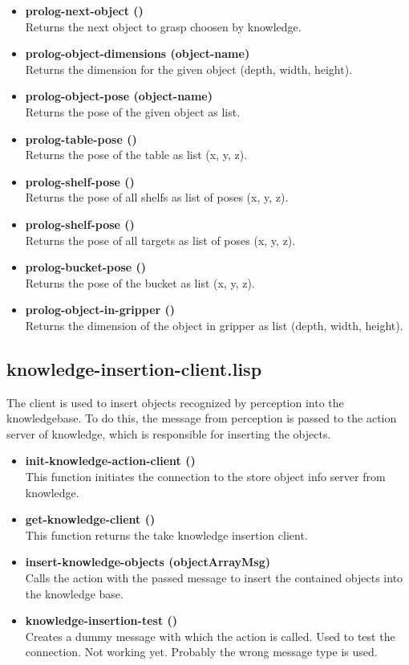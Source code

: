 \documentclass[main.tex]{subfiles}
\begin{document}
\begin{itemize}
				\item \textbf{prolog-next-object ()} \\ Returns the next object to grasp choosen by knowledge.
		    \item \textbf{prolog-object-dimensions (object-name)} \\ Returns the dimension for the given object (depth, width, height).
				\item \textbf{prolog-object-pose (object-name)} \\ Returns the pose of the given object as list.
				\item \textbf{prolog-table-pose ()} \\ Returns the pose of the table as list (x, y, z).
				\item \textbf{prolog-shelf-pose ()} \\ Returns the pose of all shelfs as list of poses (x, y, z).
				\item \textbf{prolog-shelf-pose ()} \\ Returns the pose of all targets as list of poses (x, y, z).
				\item \textbf{prolog-bucket-pose ()} \\ Returns the pose of the bucket as list (x, y, z).
				\item \textbf{prolog-object-in-gripper ()} \\ Returns the dimension of the object in gripper as list (depth, width, height).
			\end{itemize} 
		\subsection{knowledge-insertion-client.lisp}
		\label{knowledge-insertion}
		The client is used to insert objects recognized by perception into the knowledgebase. To do this, the message from perception is passed to the action server of knowledge, which is responsible for inserting the objects.
		\begin{itemize}
		  \item \textbf{init-knowledge-action-client ()} \\
		  This function initiates the connection to the store object info server from knowledge.
		  \item \textbf{get-knowledge-client ()}  \\
		  This function returns the take knowledge insertion client.
		  \item \textbf{insert-knowledge-objects (objectArrayMsg)} \\
		  Calls the action with the passed message to insert the contained objects into the knowledge base.
		  \item \textbf{knowledge-insertion-test ()} \\
		  Creates a dummy message with which the action is called. Used to test the connection. Not working yet. Probably the wrong message type is used.
		\end{itemize}
\end{document}

